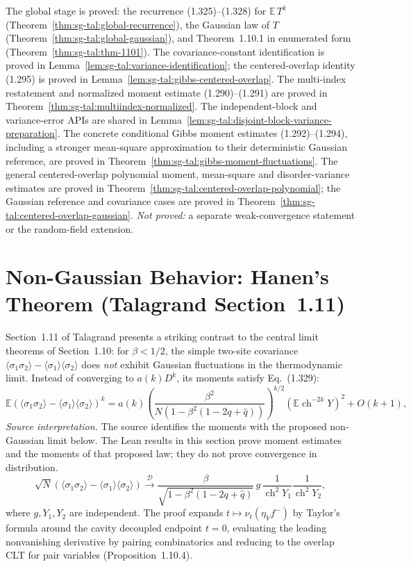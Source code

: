 \begin{remark}
The global stage is proved: the recurrence (1.325)--(1.328) for $\mathbb E\,T^k$
(Theorem~\ref{thm:sg-tal:global-recurrence}), the Gaussian law of $T$
(Theorem~\ref{thm:sg-tal:global-gaussian}), and Theorem~1.10.1 in enumerated form
(Theorem~\ref{thm:sg-tal:thm-1101}).
The covariance-constant identification is proved in
Lemma~\ref{lem:sg-tal:variance-identification}; the centered-overlap identity (1.295)
is proved in Lemma~\ref{lem:sg-tal:gibbs-centered-overlap}.
The multi-index restatement and normalized moment estimate (1.290)--(1.291) are
proved in Theorem~\ref{thm:sg-tal:multiindex-normalized}. The independent-block and
variance-error APIs are shared in Lemma~\ref{lem:sg-tal:disjoint-block-variance-preparation}.
The concrete conditional Gibbs moment estimates (1.292)--(1.294), including a stronger
mean-square approximation to their deterministic Gaussian reference, are proved in
Theorem~\ref{thm:sg-tal:gibbs-moment-fluctuations}.
The general centered-overlap polynomial moment, mean-square and disorder-variance
estimates are proved in Theorem~\ref{thm:sg-tal:centered-overlap-polynomial}; the
Gaussian reference and covariance cases are proved in
Theorem~\ref{thm:sg-tal:centered-overlap-gaussian}.
\emph{Not proved:} a separate weak-convergence statement or the random-field extension.
\end{remark}

\section{Non-Gaussian Behavior: Hanen's Theorem (Talagrand Section~1.11)}\label{sec:sg-tal:hanen}

Section~1.11 of Talagrand presents a striking contrast to the central limit theorems
of Section~1.10: for $\beta < 1/2$, the simple two-site covariance
$\langle \sigma_1 \sigma_2 \rangle - \langle \sigma_1 \rangle \langle \sigma_2 \rangle$
does \emph{not} exhibit Gaussian fluctuations in the thermodynamic limit.
Instead of converging to $a(k) D^k$, its moments satisfy Eq.~(1.329):
\[
\mathbb E(\langle \sigma_1 \sigma_2 \rangle - \langle \sigma_1 \rangle \langle \sigma_2 \rangle)^k
= a(k) \left( \frac{\beta^2}{N(1 - \beta^2(1 - 2q + \hat q))} \right)^{k/2} (\mathbb E \operatorname{ch}^{-2k} Y)^2
+ O(k+1),
\]
\emph{Source interpretation.} The source identifies the moments with the proposed non-Gaussian limit below. The Lean results in this section prove moment estimates and the moments of that proposed law; they do not prove convergence in distribution.
\[
\sqrt{N} (\langle \sigma_1 \sigma_2 \rangle - \langle \sigma_1 \rangle \langle \sigma_2 \rangle)
\stackrel{\mathcal D}{\longrightarrow}
\frac{\beta}{\sqrt{1 - \beta^2(1 - 2q + \hat q)}} \, g \, \frac{1}{\operatorname{ch}^2 Y_1} \frac{1}{\operatorname{ch}^2 Y_2},
\]
where $g, Y_1, Y_2$ are independent.
The proof expands $t \mapsto \nu_t(\eta_V f^-)$ by Taylor's formula around the cavity decoupled
endpoint $t = 0$, evaluating the leading nonvanishing derivative by pairing combinatorics
and reducing to the overlap CLT for pair variables (Proposition~1.10.4).


